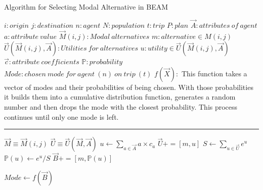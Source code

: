 \documentclass[simple, masters, twoside]{byuthesis}
\begin{document}
\begin{algorithm}
\caption{Algorithm for Selecting Modal Alternative in BEAM}
\begin{algorithmic}[1]
\Require
\State $i : origin$
\State $j : destination$
\State $n: agent$
\State $N: population$
\State $t : trip $
\State $P : plan$
\State $\vec{A}: attributes\:of\:agent$
\State $a: attribute\:value$
\State $\vec{M}(i,j) : Modal\:alternatives$
\State $m : alternative \in M(i,j)$
\State $\vec{U}(\vec{M}(i,j),\vec{A}):Utilities\:for\:alternatives$
\State $u: utility \in \vec{U}(\vec{M}(i,j),\vec{A})$
\State $\vec{c}: attribute\:coefficients$
\State $\mathds{P}: probability$
\State $Mode: chosen\:mode\:for\:agent\:(n)\:on\:trip\:(t)$
\State $f(\vec{X}):$
This function takes a vector of modes and  their probabilities of being chosen. With those probabilities it builds them into a cumulative distribution function, generates a random number and then drops the mode with the closest probability. This process continues until only one mode is left.
\vspace{4pt}\hrule\vspace{5pt}

\State $\vec{M} \equiv \vec{M}(i,j)$
\State $\vec{U} \equiv \vec{U}(\vec{M},\vec{A})$
  \State $u \gets \sum_{a\in \vec{A}} a \times c_a$
  \State $\vec{U} += [m,u]$
\EndFor
\State $S \gets \sum_{u\in \vec{U}}e^u$
    \State $\mathds{P}(u)\gets e^u / S$
    \State $\vec{B} +=[m, \mathds{P}(u)]$
\EndFor 

\State $Mode \gets f(\vec{B})$

\EndProcedure

\EndFor
\EndFor
\Statex
\end{algorithmic}
\end{algorithm}

%
\end{document}
